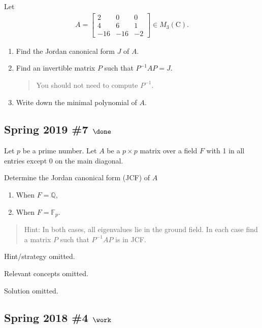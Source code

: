 Let
\begin{align*}
A=\left[\begin{array}{ccc}
2 & 0 & 0 \\
4 & 6 & 1 \\
-16 & -16 & -2
\end{array}\right] \in M_{3}(\mathrm{C})
.\end{align*}

\begin{enumerate}
\def\labelenumi{\alph{enumi}.}
\item
  Find the Jordan canonical form \(J\) of \(A\).
\item
  Find an invertible matrix \(P\) such that \(P^{-1}A P = J\).

  \begin{quote}
  You should not need to compute \(P^{-1}\).
  \end{quote}
\item
  Write down the minimal polynomial of \(A\).
\end{enumerate}

\hypertarget{spring-2019-7-done}{%
\subsection{\texorpdfstring{Spring 2019 \#7
\(\done\)}{Spring 2019 \#7 \textbackslash done}}\label{spring-2019-7-done}}

Let \(p\) be a prime number. Let \(A\) be a \(p \times p\) matrix over a
field \(F\) with 1 in all entries except 0 on the main diagonal.

Determine the Jordan canonical form (JCF) of \(A\)

\begin{enumerate}
\def\labelenumi{\alph{enumi}.}
\item
  When \(F = {\mathbb{Q}}\),
\item
  When \(F = {\mathbb{F}}_p\).
\end{enumerate}

\begin{quote}
Hint: In both cases, all eigenvalues lie in the ground field. In each
case find a matrix \(P\) such that \(P^{-1}AP\) is in JCF.
\end{quote}

Hint/strategy omitted.

Relevant concepts omitted.

Solution omitted.

\hypertarget{spring-2018-4-work}{%
\subsection{\texorpdfstring{Spring 2018 \#4
\(\work\)}{Spring 2018 \#4 \textbackslash work}}\label{spring-2018-4-work}}

